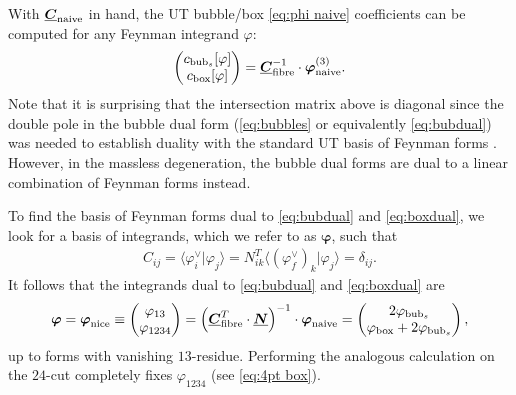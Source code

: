 \documentclass[11pt]{article}
\newcommand{\la}{\langle}
\newcommand{\ra}{\rangle}
\newcommand{\vphi}{\varphi}
\newcommand{\bs}[1]{\boldsymbol{#1}}
\newcommand{\mat}[1]{\underline{\boldsymbol{#1}}}
\begin{document}
With $\mat{C}_{\rm naive}$ in hand, the UT bubble/box \eqref{eq:phi naive} coefficients can be computed for any Feynman integrand $\vphi$: 
\begin{align}
	\begin{pmatrix} c_{{\rm bub}_s}[\vphi] \\ c_{{\rm box}}[\vphi] \end{pmatrix}
	= \mat{C}_{\rm  fibre}^{-1} \cdot \bs{\vphi}^{(3)}_{{\rm naive}}.
\end{align}
Note that it is surprising that the intersection matrix above is diagonal since the double pole in the bubble dual form (\eqref{eq:bubbles} or equivalently \eqref{eq:bubdual}) was needed to establish duality with the standard UT basis of Feynman forms \cite{Caron-Huot:2021xqj}. However, in the massless degeneration, the bubble dual forms are dual to a linear combination of Feynman forms instead. 


To find the basis of Feynman forms dual to \eqref{eq:bubdual} and \eqref{eq:boxdual}, we look for a basis of integrands, which we refer to as $\bs{\vphi}$, such that 
\begin{align} \label{eq:cmat norm}
	C_{ij}  
	= \la \vphi^\vee_i \vert \vphi_j \ra 
	= N^T_{ik} \la (\vphi^\vee_{f})_k \vert \vphi_j \ra
	= \delta_{ij}.
\end{align}
It follows that the integrands dual to \eqref{eq:bubdual} and \eqref{eq:boxdual} are
\begin{align}
	\label{eq:phi finite}
	\bs{\vphi} 
	= \bs{\vphi}_\text{nice}
	\equiv \begin{pmatrix}
		\vphi_{13}
		\\
		\vphi_{ 1234}
	\end{pmatrix}
	= \left(\mat{C}_\text{fibre}^T \cdot \mat{N}\right)^{-1} \cdot \bs{\vphi}_{\rm naive}   
	= \begin{pmatrix}
		2 \vphi_{{\rm bub}_s} \\
		\vphi_{{\rm box}} + 2 \vphi_{{\rm bub}_s}
	\end{pmatrix},
\end{align}
up to forms with vanishing $13$-residue. Performing the analogous calculation on the $24$-cut completely fixes $\vphi_{1234}$ (see \eqref{eq:4pt box}).
\end{document}
